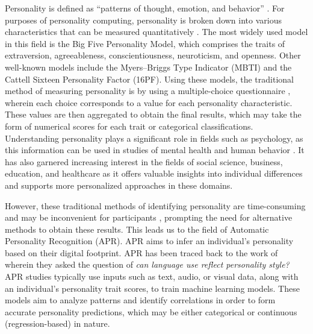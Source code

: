 
Personality is defined as “patterns of thought, emotion, and behavior” \citep{Vinciarelli2014}. For purposes of personality computing, personality is broken down into various characteristics that can be measured quantitatively \citep{Vinciarelli2014}. The most widely used model in this field is the Big Five Personality Model, which comprises the traits of extraversion, agreeableness, conscientiousness, neuroticism, and openness. Other well-known models include the Myers–Briggs Type Indicator (MBTI) and the Cattell Sixteen Personality Factor (16PF). Using these models, the traditional method of measuring personality is by using a multiple-choice questionnaire \citep{farnadi2018}, wherein each choice corresponds to a value for each personality characteristic. These values are then aggregated to obtain the final results, which may take the form of numerical scores for each trait or categorical classifications. Understanding personality plays a significant role in fields such as psychology, as this information can be used in studies of mental health and human behavior \citep{Judge2013, Poropat2009}. It has also garnered increasing interest in the fields of social science, business, education, and healthcare \citep{Miller2014} as it offers valuable insights into individual differences and supports more personalized approaches in these domains.

However, these traditional methods of identifying personality are time-consuming and may be inconvenient for participants \citep{Vinciarelli2014}, prompting the need for alternative methods to obtain these results. This leads us to the field of Automatic Personality Recognition (APR). APR aims to infer an individual’s personality based on their digital footprint. APR has been traced back to the work of \citet{Pennebaker1999} wherein they asked the question of \textit{can language use reflect personality style?} APR studies typically use inputs such as text, audio, or visual data, along with an individual’s personality trait scores, to train machine learning models. These models aim to analyze patterns and identify correlations in order to form accurate personality predictions, which may be either categorical or continuous (regression-based) in nature.




